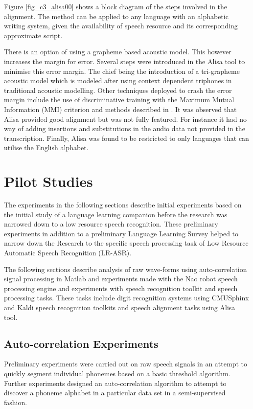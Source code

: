 Figure \ref{fig_c3_alisa00} shows a block diagram of the steps involved in the alignment.  The method can be applied to any language with an alphabetic writing system, given the availability of speech resource and its corresponding approximate script.

There is an option of using a grapheme based acoustic model. This however increases the margin for error.  Several steps were introduced in the Alisa tool to minimise this error margin. The chief being the introduction of a tri-grapheme acoustic model which is modeled after using context dependent triphones in traditional acoustic modelling.  Other techniques deployed to crash the error margin include the use of discriminative training with the Maximum Mutual Information (MMI) criterion \citep{schluter2001model} and methods described in \citep{novotney2009analysis}. It was observed that Alisa provided good alignment but was not fully featured. For instance it had no way of adding insertions and substitutions in the audio data not provided in the transcription.  Finally, Alisa was found to be restricted to only languages that can utilise the English alphabet.

\section{Pilot Studies}
The experiments in the following sections describe initial experiments based on the initial study of a language learning companion before the research was narrowed down to a low resource speech recognition.  These preliminary experiments in addition to a preliminary Language Learning Survey helped to narrow down the Research to the specific speech processing task of Low Resource Automatic Speech Recognition (LR-ASR).

The following sections describe analysis of raw wave-forms using auto-correlation signal processing in Matlab and experiments made with the Nao robot speech processing engine and experiments with speech recognition toolkit and speech processing tasks.  These tasks include digit recognition systems using CMUSphinx and Kaldi speech recognition toolkits and speech alignment tasks using Alisa tool.

\subsection{Auto-correlation Experiments}\label{sec_c3_corr}
Preliminary experiments were carried out on raw speech signals in an attempt to quickly segment individual phonemes based on a basic threshold algorithm.  Further experiments designed an auto-correlation algorithm to attempt to discover a phoneme alphabet in a particular data set in a semi-supervised fashion.
 
